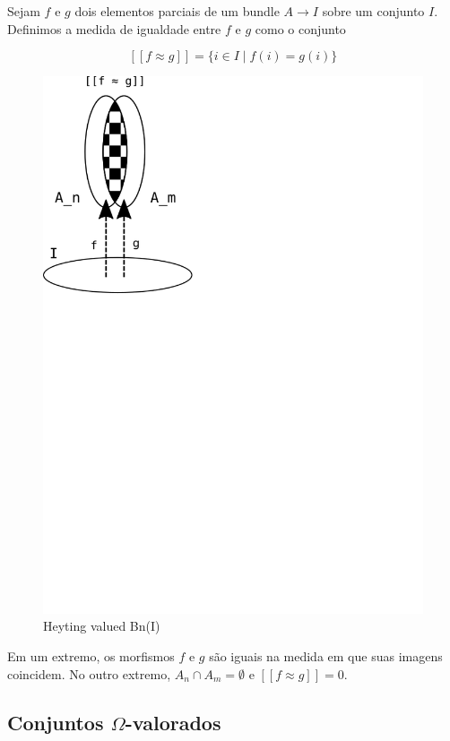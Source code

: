 Sejam \(f\) e \(g\) dois elementos parciais de um bundle
\(A \rightarrow I\) sobre um conjunto \(I\). Definimos a medida de
igualdade entre \(f\) e \(g\) como o conjunto

\[
[[ f \approx g ]] = \{ i \in I \mid f(i) = g(i) \}
\]

\begin{figure}
\centering
\includegraphics{bn_h_valued.png}
\caption{Heyting valued Bn(I)}
\end{figure}

Em um extremo, os morfismos \(f\) e \(g\) são iguais na medida em que
suas imagens coincidem. No outro extremo, \(A_n \cap A_m = \emptyset\) e
\([[ f \approx g ]] = 0\).

\hypertarget{conjuntos-omega-valorados}{%
\subsection{\texorpdfstring{Conjuntos
\(\Omega\)-valorados}{Conjuntos \textbackslash Omega-valorados}}\label{conjuntos-omega-valorados}}

